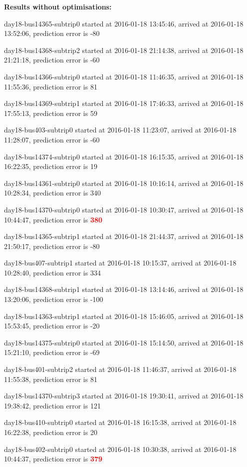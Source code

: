 \documentclass[12pt,a4paper,oneside,openright]{report}
\begin{document}
\textbf{Results without optimisations:}


{\footnotesize
day18-bus14365-subtrip0 started at 2016-01-18 13:45:46, arrived at 2016-01-18 13:52:06, prediction error is -80 

day18-bus14368-subtrip2 started at 2016-01-18 21:14:38, arrived at 2016-01-18 21:21:18, prediction error is -60

day18-bus14366-subtrip0 started at 2016-01-18 11:46:35, arrived at 2016-01-18 11:55:36, prediction error is 81

day18-bus14369-subtrip1 started at 2016-01-18 17:46:33, arrived at 2016-01-18 17:55:13, prediction error is 59

day18-bus403-subtrip0 started at 2016-01-18 11:23:07,    arrived at 2016-01-18 11:28:07, prediction error is -60

day18-bus14374-subtrip0 started at 2016-01-18 16:15:35, arrived at 2016-01-18 16:22:35, prediction error is 19

day18-bus14361-subtrip0 started at 2016-01-18 10:16:14, arrived at 2016-01-18 10:28:34, prediction error is 340

day18-bus14370-subtrip0 started at 2016-01-18 10:30:47, arrived at 2016-01-18 10:44:47, prediction error is \textcolor{red}{\textbf{380}}

day18-bus14365-subtrip1 started at 2016-01-18 21:44:37, arrived at 2016-01-18 21:50:17, prediction error is -80 

day18-bus407-subtrip1 started at 2016-01-18 10:15:37,    arrived at 2016-01-18 10:28:40, prediction error is 334

day18-bus14368-subtrip1 started at 2016-01-18 13:14:46, arrived at 2016-01-18 13:20:06, prediction error is -100

day18-bus14363-subtrip1 started at 2016-01-18 15:46:05, arrived at 2016-01-18 15:53:45, prediction error is -20

day18-bus14375-subtrip0 started at 2016-01-18 15:14:50, arrived at 2016-01-18 15:21:10, prediction error is -69

day18-bus401-subtrip2 started at 2016-01-18 11:46:37,    arrived at 2016-01-18 11:55:38, prediction error is 81

day18-bus14370-subtrip3 started at 2016-01-18 19:30:41, arrived at 2016-01-18 19:38:42, prediction error is 121

day18-bus410-subtrip0 started at 2016-01-18 16:15:38,    arrived at 2016-01-18 16:22:38, prediction error is 20

day18-bus402-subtrip0 started at 2016-01-18 10:30:38,    arrived at 2016-01-18 10:44:37, prediction error is \textcolor{red}{\textbf{379}}

}
\end{document}
